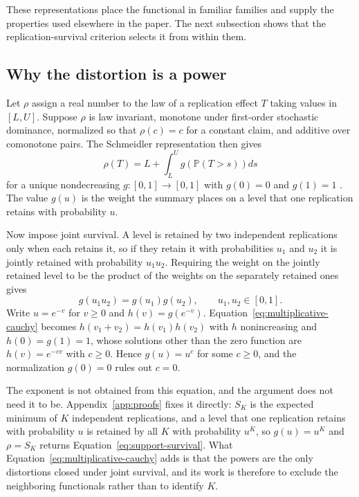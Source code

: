 \documentclass[11pt]{article}
\newcommand{\Prb}{\mathbb{P}}
\theoremstyle{remark}
\begin{document}
These representations place the functional in familiar families and supply the properties used elsewhere in the paper. The next subsection shows that the replication-survival criterion selects it from within them.

\subsection{Why the distortion is a power}
\label{app:characterization}

Let $\rho$ assign a real number to the law of a replication effect $T$ taking values in $[L,U]$. Suppose $\rho$ is law invariant, monotone under first-order stochastic dominance, normalized so that $\rho(c)=c$ for a constant claim, and additive over comonotone pairs. The Schmeidler representation then gives
\begin{equation}
\rho(T)
=
L
+
\int_L^U
g\left(\Prb(T>s)\right)
ds
\label{eq:distortion-representation}
\end{equation}
for a unique nondecreasing $g:[0,1]\to[0,1]$ with $g(0)=0$ and $g(1)=1$ \cite{schmeidler1986integral,yaari1987dual}. The value $g(u)$ is the weight the summary places on a level that one replication retains with probability $u$.

Now impose joint survival. A level is retained by two independent replications only when each retains it, so if they retain it with probabilities $u_1$ and $u_2$ it is jointly retained with probability $u_1u_2$. Requiring the weight on the jointly retained level to be the product of the weights on the separately retained ones gives
\begin{equation}
g(u_1u_2)=g(u_1)g(u_2),
\qquad
u_1,u_2\in[0,1].
\label{eq:multiplicative-cauchy}
\end{equation}
Write $u=e^{-v}$ for $v\geq0$ and $h(v)=g(e^{-v})$. Equation~\eqref{eq:multiplicative-cauchy} becomes $h(v_1+v_2)=h(v_1)h(v_2)$ with $h$ nonincreasing and $h(0)=g(1)=1$, whose solutions other than the zero function are $h(v)=e^{-cv}$ with $c\geq0$. Hence $g(u)=u^{c}$ for some $c\geq0$, and the normalization $g(0)=0$ rules out $c=0$.

The exponent is not obtained from this equation, and the argument does not need it to be. Appendix~\ref{app:proofs} fixes it directly: $S_K$ is the expected minimum of $K$ independent replications, and a level that one replication retains with probability $u$ is retained by all $K$ with probability $u^{K}$, so $g(u)=u^{K}$ and $\rho=S_K$ returns Equation~\eqref{eq:support-survival}. What Equation~\eqref{eq:multiplicative-cauchy} adds is that the powers are the only distortions closed under joint survival, and its work is therefore to exclude the neighboring functionals rather than to identify $K$.
\end{document}
